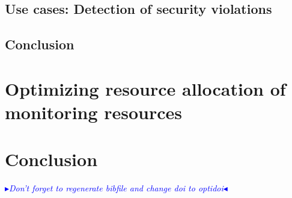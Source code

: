 \documentclass[a4paper, 11pt]{report}
\newcommand{\boxedtext}[1]{\fbox{\scriptsize\bfseries\textsf{#1}}}
\newcommand{\myremark}[2]{
   \textcolor{blue}{\boxedtext{#1}
      {\small$\blacktriangleright$\emph{\textsl{#2}}$\blacktriangleleft$}
}}
\newcommand\FC[1]{\myremark{FC}{#1}}
\theoremstyle{definition}
\begin{document}
\newpage
\section{Use cases: Detection of security violations}


\newpage
\section{Conclusion}


\newpage
\chapter{Optimizing resource allocation of monitoring resources}
\label{sec:RAprob}




\newpage


\newpage
\chapter{Conclusion}

\newpage
\FC{Don't forget to regenerate bibfile and change doi to optidoi}
{}


\newpage
\begin{appendices}

\newpage
% 
\newpage

\end{appendices}
\end{document}
